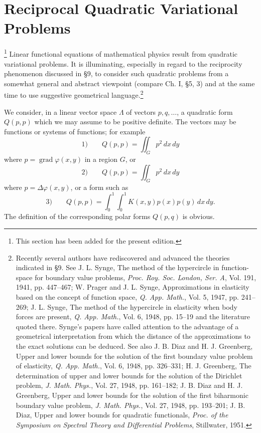 \section{Reciprocal Quadratic Variational Problems}\footnote{This section has been added for the present edition.}
Linear functional equations of mathematical physics result from quadratic variational problems. It is illuminating, especially in regard to the reciprocity phenomenon discussed in \S9, to consider such quadratic problems from a somewhat general and abstract viewpoint (compare Ch. I, \S5, 3) and at the same time to use suggestive geometrical language.\footnote{Recently several authors have rediscovered and advanced the theories indicated in \S9. See J. L. Synge, The method of the hypercircle in function-space for boundary value problems, \emph{Proc. Roy. Soc. London, Ser. A}, Vol. 191, 1941, pp. 447--467; W. Prager and J. L. Synge, Approximations in elasticity based on the concept of function space, \emph{Q. App. Math.}, Vol. 5, 1947, pp. 241--269; J. L. Synge, The method of the hypercircle in elasticity when body forces are present, \emph{Q. App. Math.}, Vol. 6, 1948, pp. 15--19 and the literature quoted there. Synge's papers have called attention to the advantage of a geometrical interpretation from which the distance of the approximations to the exact solutions can be deduced. See also J. B. Diaz and H. J. Greenberg, Upper and lower bounds for the solution of the first boundary value problem of elasticity, \emph{Q. App. Math.}, Vol. 6, 1948, pp. 326--331; H. J. Greenberg, The determination of upper and lower bounds for the solution of the Dirichlet problem, \emph{J. Math. Phys.}, Vol. 27, 1948, pp. 161--182; J. B. Diaz and H. J. Greenberg, Upper and lower bounds for the solution of the first biharmonic boundary value problem, \emph{J. Math. Phys.}, Vol. 27, 1948, pp. 193--201; J. B. Diaz, Upper and lower bounds for quadratic functionals, \emph{Proc. of the Symposium on Spectral Theory and Differential Problems}, Stillwater, 1951.}

We consider, in a linear vector space $\Lambda$ of vectors $p,q,\ldots$, a quadratic form $Q(p,p)$ which we may assume to be positive definite. The vectors may be functions or systems of functions; for example
\[
\text{1)}\qquad Q(p,p)=\iint_G p^2\,dx\,dy
\]
where $p=\operatorname{grad}\varphi(x,y)$ in a region $G$, or
\[
\text{2)}\qquad Q(p,p)=\iint_Gp^2\,dx\,dy
\]
where $p=\Delta\varphi(x,y)$, or a form such as
\[
\text{3)}\qquad Q(p,p)=\int_0^1\int_0^1K(x,y)p(x)p(y)\,dx\,dy.
\]
The definition of the corresponding polar forms $Q(p,q)$ is obvious.

